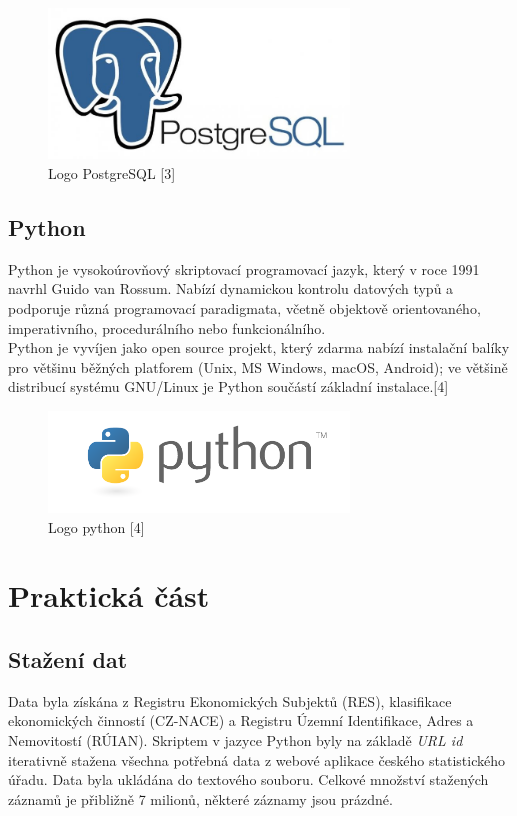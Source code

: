 \documentclass[a4paper, 12pt]{article}
\begin{document}
\begin{figure}[h!]
	\centering
	\includegraphics[width=8cm]{PSQL.jpg}
	\caption{Logo PostgreSQL [3]}
\end{figure}

\subsection{Python}
Python je vysokoúrovňový skriptovací programovací jazyk, který v roce 1991 navrhl Guido van Rossum. Nabízí dynamickou kontrolu datových typů a podporuje různá programovací paradigmata, včetně objektově orientovaného, imperativního, procedurálního nebo funkcionálního.\\
Python je vyvíjen jako open source projekt, který zdarma nabízí instalační balíky pro většinu běžných platforem (Unix, MS Windows, macOS, Android); ve většině distribucí systému GNU/Linux je Python součástí základní instalace.[4]

\begin{figure}[h!]
	\centering
	\includegraphics[width=8cm]{python.png}
	\caption{Logo python [4]}
\end{figure}

\section{Praktická část}

\subsection{Stažení dat}
Data byla získána z Registru Ekonomických Subjektů (RES), klasifikace ekonomických činností (CZ-NACE) a Registru Územní Identifikace, Adres a Nemovitostí (RÚIAN). Skriptem v jazyce Python byly na základě \textit{URL id} iterativně stažena všechna potřebná data z webové aplikace českého statistického úřadu. Data byla ukládána do textového souboru. Celkové množství stažených záznamů je přibližně 7 milionů, některé záznamy jsou prázdné.
\end{document}

